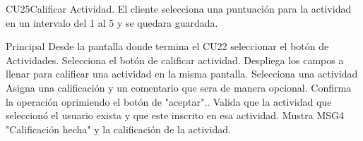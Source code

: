 
\begin{UseCase}{CU25}{Calificar Actividad.}{
		El cliente selecciona una puntuación para la actividad en un intervalo del 1 al 5 y se quedara guardada.
	}
\end{UseCase}

\begin{UCtrayectoria}{Principal}
	\UCpaso[\UCactor] Desde la pantalla donde termina el CU22 seleccionar el botón de Actividades.
	\UCpaso[\UCactor] Selecciona el botón de calificar actividad.
	\UCpaso Despliega los campos a llenar para calificar una actividad en la misma pantalla.
	\UCpaso[\UCactor] Selecciona una actividad
	\UCpaso[\UCactor] Asigna una calificación y un comentario que sera de manera opcional.
	\UCpaso[\UCactor] Confirma la operación oprimiendo el botón de "aceptar"..
	\UCpaso Valida que la actividad que seleccionó el usuario exista y que este inscrito en esa actividad.
	\UCpaso Mustra MSG4 "Calificación hecha" y la calificación de la actividad.
	
\end{UCtrayectoria}




